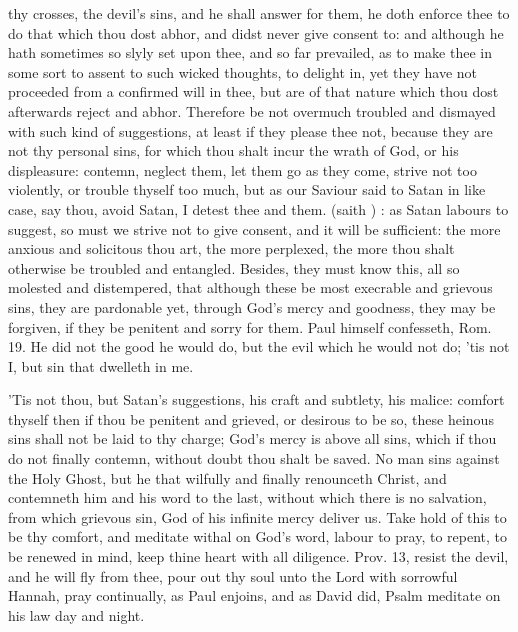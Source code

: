 {thy crosses, the devil's sins, and he shall answer for them, he doth
enforce thee to do that which thou dost abhor, and didst never give
consent to: and although he hath sometimes so slyly set upon thee, and
so far prevailed, as to make thee in some sort to assent to such wicked
thoughts, to delight in, yet they have not proceeded from a confirmed
will in thee, but are of that nature which thou dost afterwards reject
and abhor. Therefore be not overmuch troubled and dismayed with such
kind of suggestions, at least if they please thee not, because they are
not thy personal sins, for which thou shalt incur the wrath of God, or
his displeasure: contemn, neglect them, let them go as they come,
strive not too violently, or trouble thyself too much, but as our
Saviour said to Satan in like case, say thou, avoid Satan, I detest
thee and them.  (saith \Austin{}) : as Satan labours to suggest, so must we strive not to give
consent, and it will be sufficient: the more anxious and solicitous
thou art, the more perplexed, the more thou shalt otherwise be troubled
and entangled. Besides, they must know this, all so molested and
distempered, that although these be most execrable and grievous sins,
they are pardonable yet, through God's mercy and goodness, they may be
forgiven, if they be penitent and sorry for them. Paul himself
confesseth, Rom.  19. He did not the good he would do, but the
evil which he would not do; 'tis not I, but sin that dwelleth in me.

'Tis not thou, but Satan's suggestions, his craft and subtlety, his
malice: comfort thyself then if thou be penitent and grieved, or
desirous to be so, these heinous sins shall not be laid to thy charge;
God's mercy is above all sins, which if thou do not finally contemn,
without doubt thou shalt be saved. No man sins against the Holy
Ghost, but he that wilfully and finally renounceth Christ, and
contemneth him and his word to the last, without which there is no
salvation, from which grievous sin, God of his infinite mercy deliver
us. Take hold of this to be thy comfort, and meditate withal on God's
word, labour to pray, to repent, to be renewed in mind, keep thine
heart with all diligence. Prov.  13, resist the devil, and he will
fly from thee, pour out thy soul unto the Lord with sorrowful Hannah,
pray continually, as Paul enjoins, and as David did, Psalm  meditate
on his law day and night.

}
